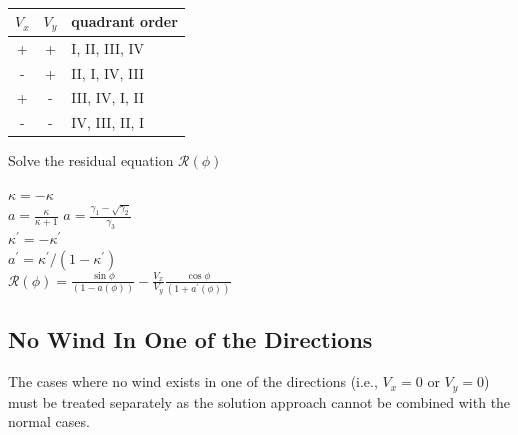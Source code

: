 \documentclass{article}
\begin{document}
\begin{table}[htb]
\centering
\caption{}
\label{tab:brackets}
\begin{tabular}{@{}ccl@{}}
\toprule
$V_x$ & $V_y$ & quadrant order \\
\midrule
+ & + & I, II, III, IV \\
- & + & II, I, IV, III \\
+ & - & III, IV, I, II \\
- & - & IV, III, II, I \\
\bottomrule
\end{tabular}
\end{table}



\begin{algorithm}[htbp]
\caption{Solve the residual equation $\mathcal{R}(\phi)$}
\begin{algorithmic}

    \State $\kappa = -\kappa$
\EndIf
\\
    \State $a = \frac{\kappa}{\kappa + 1}$
\Else
    \State $a = \frac{\gamma_1 - \sqrt{\gamma_2}}{\gamma_3}$
\EndIf
\\
    \State $\kappa^\prime = -\kappa^\prime$
\EndIf
\\
\State $a^\prime = \kappa^\prime/(1 - \kappa^\prime)$
\\
\State $\mathcal{R}(\phi) = \frac{\sin\phi}{(1 - a(\phi))} - \frac{V_x}{V_y} \frac{\cos\phi}{(1 + a^\prime(\phi))}$
\end{algorithmic}
\label{alg:aap}
\end{algorithm}

\subsection{No Wind In One of the Directions}

The cases where no wind exists in one of the directions (i.e., $V_x = 0$ or $V_y = 0$) must be treated separately as the solution approach cannot be combined with the normal cases.
\end{document}
